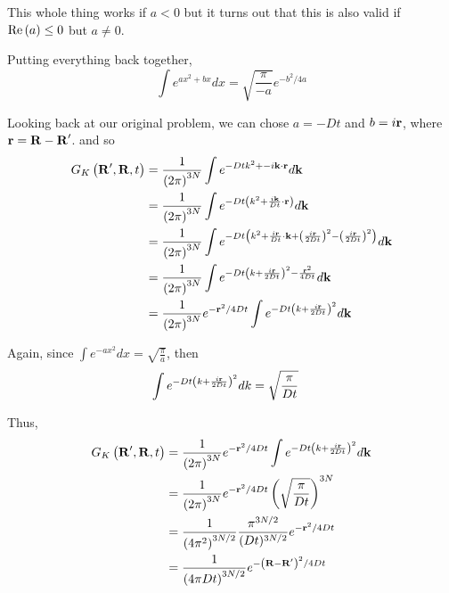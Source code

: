 This whole thing works if $a < 0$ but it turns out that this is also valid if $\operatorname{Re}{(a)} \leq 0$ but $a \neq 0$.

Putting everything back together,
$$
\int e^{ax^2 + bx} dx = \sqrt{ \frac{\pi}{-a} } e^{-b^2/4a}
$$

Looking back at our original problem, we can chose $a = -Dt$ and $b = i \boldsymbol{\mathbf{r}}$, where $\boldsymbol{\mathbf{r}} = \boldsymbol{\mathbf{R}}-\boldsymbol{\mathbf{R}}^\prime$.
and so
\begin{align*}
G_K \left(\boldsymbol{\mathbf{R}}^\prime, \boldsymbol{\mathbf{R}}, t\right) &=
\frac{1}{\left(2\pi\right)^{3N}} \int e^{-Dtk^2 + -i\boldsymbol{\mathbf{k}}\cdot\boldsymbol{\mathbf{r}}} d\mathbf{k} \\
&= \frac{1}{\left(2\pi\right)^{3N}} \int e^{-Dt \left( k^2 + \frac{i\boldsymbol{\mathbf{k}}}{Dt}\cdot\boldsymbol{\mathbf{r}} \right)} d\mathbf{k} \\
&= \frac{1}{\left(2\pi\right)^{3N}} \int e^{-Dt \left( k^2 + \frac{i\boldsymbol{\mathbf{r}}}{Dt}\cdot\boldsymbol{\mathbf{k}} + \left(\frac{i\boldsymbol{\mathbf{r}}}{2Dt}\right)^2 - \left(\frac{i\boldsymbol{\mathbf{r}}}{2Dt}\right)^2 \right)} d\mathbf{k} \\
&= \frac{1}{\left(2\pi\right)^{3N}} \int e^{-Dt \left( k + \frac{i\boldsymbol{\mathbf{r}}}{2Dt}\right)^2 - \frac{ \boldsymbol{\mathbf{r}}^2 }{ 4Dt } } d\mathbf{k} \\
&= \frac{1}{\left(2\pi\right)^{3N}} e^{-\boldsymbol{\mathbf{r}}^2 /4Dt } \int e^{-Dt \left( k + \frac{i\boldsymbol{\mathbf{r}}}{2Dt}\right)^2 } d\mathbf{k} \\
\end{align*}

Again, since $\int e^{-ax^2} dx = \sqrt{ \frac{\pi}{a} }$,
then
\begin{align*}
\int e^{-Dt \left( k + \frac{i\boldsymbol{\mathbf{r}}}{2Dt}\right)^2 } dk &= \sqrt{ \frac{\pi}{Dt} }
\end{align*}

Thus,
\begin{align*}
G_K \left(\boldsymbol{\mathbf{R}}^\prime, \boldsymbol{\mathbf{R}}, t\right) &=
\frac{1}{\left(2\pi\right)^{3N}} e^{-\boldsymbol{\mathbf{r}}^2 /4Dt } \int e^{-Dt \left( k + \frac{i\boldsymbol{\mathbf{r}}}{2Dt}\right)^2 } d\mathbf{k} \\
&= \frac{1}{\left(2\pi\right)^{3N}} e^{-\boldsymbol{\mathbf{r}}^2 /4Dt } \left( \sqrt{ \frac{\pi}{Dt} } \right)^{3N} \\
&= \frac{1}{\left(4\pi^2\right)^{3N/2}} \frac{\pi^{3N/2}}{(Dt)^{3N/2}} e^{-\boldsymbol{\mathbf{r}}^2 /4Dt } \\
&= \frac{1}{\left(4\pi Dt\right)^{3N/2}} e^{-\left(\boldsymbol{\mathbf{R}} - \boldsymbol{\mathbf{R}}^\prime\right)^2 /4Dt }
\end{align*}




